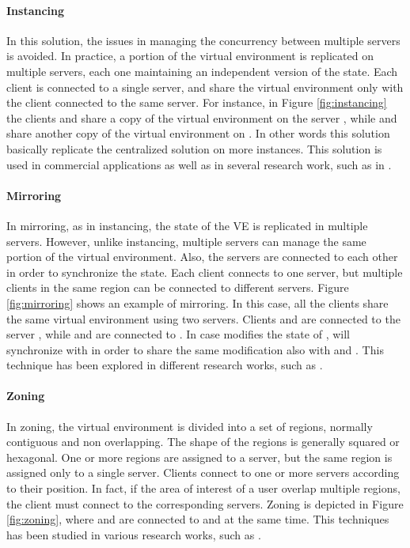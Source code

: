 \documentclass[final,10pt,a5paper]{phdimt}
\theoremstyle{definition}
\begin{document}
\paragraph{Instancing}
In this solution, the issues in managing the concurrency between multiple servers is avoided.
In practice, a portion of the virtual environment is replicated on multiple servers, each one maintaining an independent version of the state.
Each client is connected to a single server, and share the virtual environment only with the client connected to the same server.
For instance, in Figure \ref{fig:instancing} the clients  and  share a copy of the virtual environment on the server , while  and  share another copy of the virtual environment on .
In other words this solution basically replicate the centralized solution on more instances.
This solution is used in commercial applications as well as in several research work, such as in \cite{Barri2011}.

\paragraph{Mirroring}
In mirroring, as in instancing, the state of the VE is replicated in multiple servers.
However, unlike instancing, multiple servers can manage the same portion of the virtual environment.
Also, the servers are connected to each other in order to synchronize the state.
Each client connects to one server, but multiple clients in the same region can be connected to different servers.
Figure \ref{fig:mirroring}  shows an example of mirroring. 
In this case, all the clients share the same virtual environment using two servers.
Clients  and  are connected to the server , while  and  are connected to .
In case  modifies the state of ,  will synchronize with  in order to share the same modification also with  and . This technique has been explored in different research works, such as \cite{cronin2004efficient,mauve2002generic}. 

\paragraph{Zoning}
In zoning, the virtual environment is divided into a set of regions, normally contiguous and non overlapping.
The shape of the regions is generally squared or hexagonal. 
One or more regions are assigned to a server, but the same region is assigned only to a single server.
Clients connect to one or more servers according to their position. In fact, if the area of interest of a user overlap multiple regions, the client must connect to the corresponding servers.
Zoning is depicted in Figure \ref{fig:zoning}, where  and  are connected to  and  at the same time.
This techniques has been studied in various research works, such as \cite{carlini2010integration,Kim2004,greenhalgh1995massive,lee2002atlas}.\\
\end{document}
